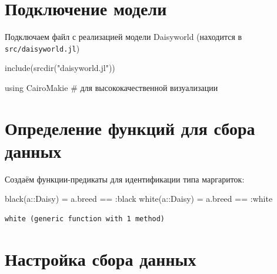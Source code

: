 \documentclass[
  12pt,
  a4paper,
  DIV=11,
  numbers=noendperiod]{scrreprt}
\newenvironment{Shaded}{\begin{snugshade}}{\end{snugshade}}
\newcommand{\BuiltInTok}[1]{\textcolor[rgb]{0.00,0.23,0.31}{#1}}
\newcommand{\CommentTok}[1]{\textcolor[rgb]{0.37,0.37,0.37}{#1}}
\newcommand{\DataTypeTok}[1]{\textcolor[rgb]{0.68,0.00,0.00}{#1}}
\newcommand{\FunctionTok}[1]{\textcolor[rgb]{0.28,0.35,0.67}{#1}}
\newcommand{\ImportTok}[1]{\textcolor[rgb]{0.00,0.46,0.62}{#1}}
\newcommand{\NormalTok}[1]{\textcolor[rgb]{0.00,0.23,0.31}{#1}}
\newcommand{\OperatorTok}[1]{\textcolor[rgb]{0.37,0.37,0.37}{#1}}
\newcommand{\StringTok}[1]{\textcolor[rgb]{0.13,0.47,0.30}{#1}}
\begin{document}
\section{Подключение
модели}\label{ux43fux43eux434ux43aux43bux44eux447ux435ux43dux438ux435-ux43cux43eux434ux435ux43bux438-1}

Подключаем файл с реализацией модели Daisyworld (находится в
\texttt{src/daisyworld.jl})

\begin{Shaded}
\begin{Highlighting}[]
\FunctionTok{include}\NormalTok{(}\FunctionTok{srcdir}\NormalTok{(}\StringTok{"daisyworld.jl"}\NormalTok{))}

\ImportTok{using} \BuiltInTok{CairoMakie}  \CommentTok{\# для высококачественной визуализации}
\end{Highlighting}
\end{Shaded}

\section{Определение функций для сбора
данных}\label{ux43eux43fux440ux435ux434ux435ux43bux435ux43dux438ux435-ux444ux443ux43dux43aux446ux438ux439-ux434ux43bux44f-ux441ux431ux43eux440ux430-ux434ux430ux43dux43dux44bux445}

Создаём функции-предикаты для идентификации типа маргариток:

\begin{Shaded}
\begin{Highlighting}[]
\FunctionTok{black}\NormalTok{(a}\OperatorTok{::}\DataTypeTok{Daisy}\NormalTok{) }\OperatorTok{=}\NormalTok{ a.breed }\OperatorTok{==} \OperatorTok{:}\NormalTok{black}
\FunctionTok{white}\NormalTok{(a}\OperatorTok{::}\DataTypeTok{Daisy}\NormalTok{) }\OperatorTok{=}\NormalTok{ a.breed }\OperatorTok{==} \OperatorTok{:}\NormalTok{white}
\end{Highlighting}
\end{Shaded}

\begin{verbatim}
white (generic function with 1 method)
\end{verbatim}

\section{Настройка сбора
данных}\label{ux43dux430ux441ux442ux440ux43eux439ux43aux430-ux441ux431ux43eux440ux430-ux434ux430ux43dux43dux44bux445}
\end{document}
